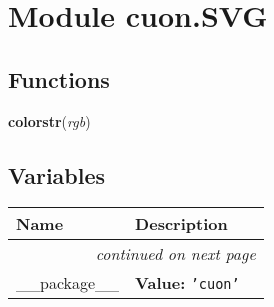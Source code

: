 %
%
%


\section{Module cuon.SVG}

    \label{cuon:SVG}


  \subsection{Functions}

    \label{cuon:SVG:colorstr}

    \vspace{0.5ex}

\hspace{.8\funcindent}\begin{boxedminipage}{\funcwidth}

    \raggedright \textbf{colorstr}(\textit{rgb})

\setlength{\parskip}{2ex}
\setlength{\parskip}{1ex}
    \end{boxedminipage}



  \subsection{Variables}

    \vspace{-1cm}
\hspace{\varindent}\begin{longtable}{|p{\varnamewidth}|p{\vardescrwidth}|l}
\cline{1-2}
\cline{1-2} \centering \textbf{Name} & \centering \textbf{Description}& \\
\cline{1-2}
\endhead\cline{1-2}\multicolumn{3}{r}{\small\textit{continued on next page}}\\\endfoot\cline{1-2}
\endlastfoot\raggedright \_\-\_\-p\-a\-c\-k\-a\-g\-e\-\_\-\_\- & \raggedright \textbf{Value:} 
{\tt \texttt{'}\texttt{cuon}\texttt{'}}&\\
\cline{1-2}
\end{longtable}


